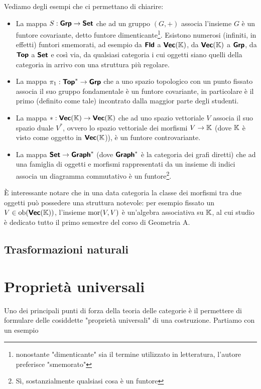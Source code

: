 \documentclass{article}
\begin{document}
Vediamo degli esempi che ci permettano di chiarire:\begin{itemize}
    \item La mappa $S:\text{\sffamily\textbf{Grp}} \to \text{\sffamily\textbf{Set}}$ che ad un gruppo $(G,+)$ associa l'insieme $G$ è un funtore covariante, detto funtore dimenticante\footnote{nonostante "dimenticante" sia il termine utilizzato in letteratura, l'autore preferisce "smemorato"}. Esistono numerosi (infiniti, in effetti) funtori smemorati, ad esempio da $\text{\sffamily\textbf{Fld}}$ a $\text{\sffamily\textbf{Vec}}(\mathbb{K})$, da $\text{\sffamily\textbf{Vec}}(\mathbb{K})$ a $\text{\sffamily\textbf{Grp}}$, da $\text{\sffamily\textbf{Top}}$ a $\text{\sffamily\textbf{Set}}$ e così via, da qualsiasi categoria i cui oggetti siano quelli della categoria in arrivo con una struttura più regolare.
    \item La mappa $\pi_1 : \text{\sffamily\textbf{Top}}^* \to \text{\sffamily\textbf{Grp}}$ che a uno spazio topologico con un punto fissato associa il suo gruppo fondamentale è un funtore covariante, in particolare è il primo (definito come tale) incontrato dalla maggior parte degli studenti.
    \item La mappa $*:\text{\sffamily\textbf{Vec}}(\mathbb{K}) \to \text{\sffamily\textbf{Vec}}(\mathbb{K}) $ che ad uno spazio vettoriale $V$ associa il suo spazio duale $V^*$, ovvero lo spazio vettoriale dei morfismi $V \to \mathbb{K}$ (dove $\mathbb{K}$ è visto come oggetto in $\text{\sffamily\textbf{Vec}}(\mathbb{K}$)), è un funtore controvariante.
    \item La mappa $\text{\sffamily\textbf{Set}} \to \text{\sffamily\textbf{Graph}}^*$ (dove $\text{\sffamily\textbf{Graph}}^*$ è la categoria dei grafi diretti) che ad una famiglia di oggetti e morfismi rappresentati da un insieme di indici associa un diagramma commutativo è un funtore\footnote{Sì, sostanzialmente qualsiasi cosa è un funtore}.
\end{itemize}

È interessante notare che in una data categoria la classe dei morfismi tra due oggetti può possedere una struttura notevole: per esempio fissato un $V \in \operatorname{ob}(\text{\sffamily\textbf{Vec}}(\mathbb{K}))$, l'insieme $\operatorname{mor}(V,V)$ è un'algebra associativa su $\mathbb{K}$, al cui studio è dedicato tutto il primo semestre del corso di Geometria A.

\subsection{Trasformazioni naturali}

\section{Proprietà universali}
\label{sec:Universal}

Uno dei principali punti di forza della teoria delle categorie è il permettere di formulare delle cosiddette "proprietà universali" di una costruzione. Partiamo con un esempio
\end{document}
